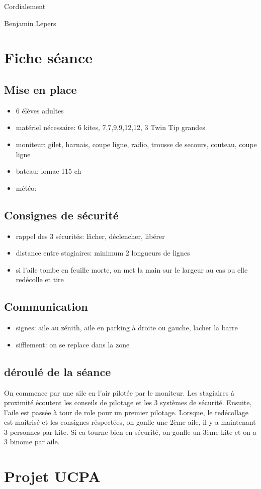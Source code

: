 \documentclass[12pt,a4paper]{report}
\begin{document}
Cordialement

Benjamin Lepers
\chapter{Fiche séance\label{fiche_seance}}
\section{Mise en place}
\begin{itemize}
\item 6 élèves adultes
\item matériel nécessaire: 6 kites, 7,7,9,9,12,12, 3 Twin Tip grandes
\item moniteur: gilet, harnais, coupe ligne, radio, trousse de secours, couteau, coupe ligne
\item bateau: lomac 115 ch
\item météo: 
\end{itemize}
\section{Consignes de sécurité}
\begin{itemize}
\item rappel des 3 sécurités: lâcher, déclencher, libérer
\item distance entre stagiaires: minimum 2 longueurs de lignes
\item si l'aile tombe en feuille morte, on met la main sur le largeur au cas ou elle redécolle et tire
\end{itemize}
\section{Communication}
\begin{itemize}
\item signes: aile au zénith, aile en parking à droite ou gauche, lacher la barre
\item sifflement: on se replace dans la zone
\end{itemize}
\section{déroulé de la séance}
On commence par une aile en l'air pilotée par le moniteur.
Les stagiaires à proximité écoutent les conseils de pilotage et les 3 systèmes
de sécurité.
Ensuite, l'aile est passée à tour de role pour un premier pilotage.
Lorsque, le redécollage est maitrisé et les consignes réspectées, 
on gonfle une 2ème aile, il y a maintenant 3 personnes par kite.
Si ca tourne bien en sécurité, on gonfle un 3ème kite et on a 3 binome par aile.

\chapter{Projet UCPA\label{ucpa_projet}}



\end{document}

